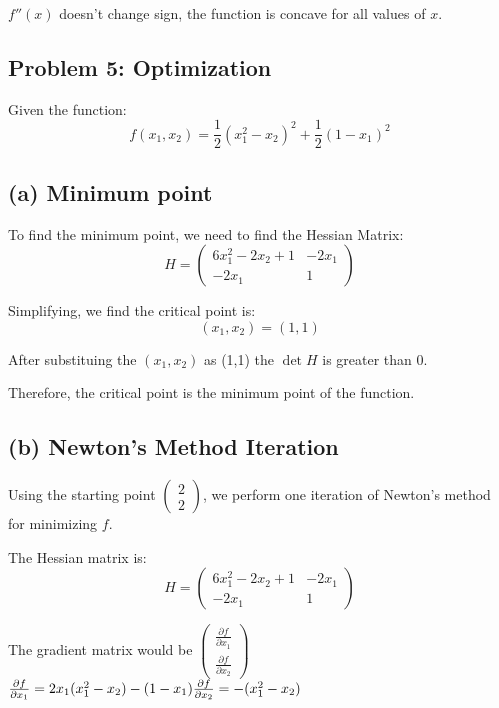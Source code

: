 \documentclass[12pt]{article}
\begin{document}
 \(f''(x)\) doesn't change sign, the function is concave for all values of \(x\).

\subsection*{Problem 5: Optimization}

Given the function:
\[
f(x_1, x_2) = \frac{1}{2}(x_1^2 - x_2)^2 + \frac{1}{2}(1 - x_1)^2
\]

\subsection*{(a) Minimum point}

To find the minimum point, we need to find the Hessian Matrix:
\[
H = \begin{pmatrix}
6x_1^2 - 2x_2 + 1 & -2x_1 \\
-2x_1 & 1
\end{pmatrix}
\]

Simplifying, we find the critical point is:
\[
(x_1, x_2) = (1, 1)
\]

After substituing the \((x_1, x_2)\) as (1,1) the \(\det{H}\) is greater than 0.

Therefore, the critical point is the minimum point of the function.

\subsection*{(b) Newton's Method Iteration}

Using the starting point \(\begin{pmatrix} 2 \\ 2 \end{pmatrix}\), we perform one iteration of Newton's method for minimizing \(f\).

The Hessian matrix is:
\[
H = \begin{pmatrix}
6x_1^2 - 2x_2 + 1 & -2x_1 \\
-2x_1 & 1
\end{pmatrix}
\]

The gradient matrix would be \(\begin{pmatrix}
    \frac{\partial f} { \partial x_1} \\
    \frac{\partial f}  {\partial x_2}
\end{pmatrix}\)
\\ 
\(
    \frac{\partial f} {\partial x_1} = 2x_1(x_1^2 - x_2) - (1 - x_1) \\
    \frac{\partial f}  {\partial x_2} = -(x_1^2 - x_2)
\)
\end{document}
